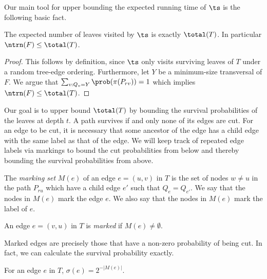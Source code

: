 Our main tool for upper bounding the expected running time of $\ts$ is the following basic fact.

\begin{fact}
\label{fact:ntrans-tree}
The expected number of leaves visited by $\ts$ is exactly $\total(T)$. In particular $\ntrn(F) \leq  \total(T)$.
\end{fact}

\begin{proof}
This follows by definition, since $\ts$ only visits surviving leaves of $T$ under a random tree-edge ordering. Furthermore, let $Y$ be  a minimum-size transversal of $F$.
We argue that $\sum_{v:Q_v=Y }\prob(\pi(P_{rv})) = 1$ which implies 
$\ntrn(F) \leq  \total(T)$.
\end{proof}

Our goal is to upper bound $\total(T)$ by bounding 
the survival probabilities of the leaves at depth $t$. 
A path survives if and only none of its edges are cut.
For an edge to be cut, it is necessary that some ancestor of the edge 
has a child edge with the same label as that of the edge. 
We will keep track of repeated edge labels via markings to bound 
the cut probabilities from below and thereby bounding the survival probabilities
from above.

\begin{definition}
The \emph{marking set} $M(e)$ of an edge $e=(u,v)$ in $T$ is the set of
nodes $w\neq u$ in the path $P_{ru}$ which have a child edge $e'$ such that $Q_e=Q_{e'}$.
We say that the nodes in $M(e)$ mark the edge $e$.
We also say that the nodes in $M(e)$ mark the label of $e$. 
\end{definition}

\begin{definition}
An edge $e=(v,u)$ in $T$ is \emph{marked}
if $M(e)\neq \emptyset$. 
\end{definition}

Marked edges are precisely those that have a non-zero probability of being cut. In fact, we can calculate the survival probability exactly.


\begin{fact}
For an edge $e$ in $T$,  $\sigma(e) = 2^{-|M(e)|}$.
\end{fact}

